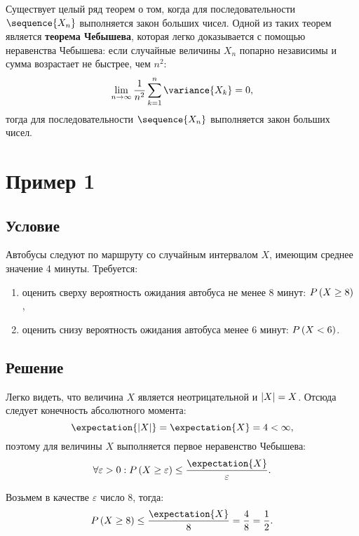 \documentclass[a4paper,12pt]{article}
\begin{document}
    Существует целый ряд теорем о том, когда для последовательности $\sequence{X_n}$ выполняется закон больших чисел.
    Одной из таких теорем является \textbf{теорема Чебышева}, которая легко доказывается с помощью неравенства Чебышева:
    если случайные величины $X_n$ попарно независимы и сумма возрастает не быстрее, чем $n^2$:
    \begin{equation}
        \lim_{n \rightarrow \infty} \frac{1}{n^2} \sum_{k=1}^n \variance{X_k} = 0 ,
    \end{equation}
    тогда для последовательности $\sequence{X_n}$ выполняется закон больших чисел.


    \section{Пример 1}
    \subsection*{Условие}
    Автобусы следуют по маршруту со случайным интервалом $X$, имеющим среднее значение 4 минуты. Требуется:
    \begin{enumerate}
        \item оценить сверху вероятность ожидания автобуса не менее 8 минут: $P \left ( X \ge 8 \right )$ ,
        \item оценить снизу вероятность ожидания автобуса менее 6 минут: $P \left ( X < 6 \right )$.
    \end{enumerate}

    \subsection*{Решение}
    Легко видеть, что величина $X$ является неотрицательной и $\left | X \right | = X$. Отсюда следует конечность абсолютного момента:
    \begin{equation}
        \expectation{\modulus{X}} = \expectation{X} = 4 < \infty ,
    \end{equation}
    поэтому для величины $X$ выполняется первое неравенство Чебышева:
    \begin{equation}
        \forall \varepsilon > 0 : \probability{X \ge \varepsilon} \le \frac{\expectation{X}}{\varepsilon} .
    \end{equation}

    Возьмем в качестве $\varepsilon$ число 8, тогда:
    \begin{equation}
        \probability{X \ge 8} \le \frac{\expectation{X}}{8} = \frac{4}{8} = \frac{1}{2}.
    \end{equation}
\end{document}
